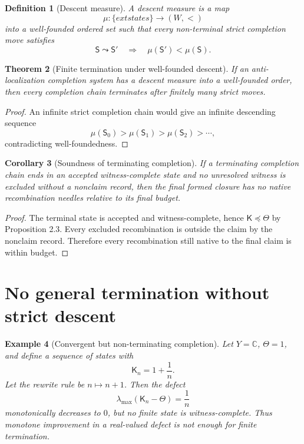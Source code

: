 \documentclass[11pt]{article}
\newtheorem{theorem}{Theorem}[section]
\newtheorem{definition}[theorem]{Definition}
\newtheorem{corollary}[theorem]{Corollary}
\newtheorem{example}[theorem]{Example}
\newcommand{\K}{\mathsf K}
\newcommand{\Sstate}{\mathsf S}
\newcommand{\pre}{\preceq}
\begin{document}
\begin{definition}[Descent measure]
A descent measure is a map
\[
\mu:\{	ext{states}\}\to(W,<)
\]
into a well-founded ordered set such that every non-terminal strict completion move satisfies
\[
\Sstate\leadsto\Sstate'
\quad\Longrightarrow\quad
\mu(\Sstate')<\mu(\Sstate).
\]
\end{definition}

\begin{theorem}[Finite termination under well-founded descent]
If an anti-localization completion system has a descent measure into a well-founded order, then every completion chain terminates after finitely many strict moves.
\end{theorem}

\begin{proof}
An infinite strict completion chain would give an infinite descending sequence
\[
\mu(\Sstate_0)>\mu(\Sstate_1)>\mu(\Sstate_2)>\cdots,
\]
contradicting well-foundedness.
\end{proof}

\begin{corollary}[Soundness of terminating completion]
If a terminating completion chain ends in an accepted witness-complete state and no unresolved witness is excluded without a nonclaim record, then the final formed closure has no native recombination needles relative to its final budget.
\end{corollary}

\begin{proof}
The terminal state is accepted and witness-complete, hence $\K\pre\Theta$ by Proposition 2.3.  Every excluded recombination is outside the claim by the nonclaim record.  Therefore every recombination still native to the final claim is within budget.
\end{proof}

\section{No general termination without strict descent}

\begin{example}[Convergent but non-terminating completion]
Let $Y=\mathbb C$, $\Theta=1$, and define a sequence of states with
\[
\K_n=1+\frac1n.
\]
Let the rewrite rule be $n\mapsto n+1$.  Then the defect
\[
\lambda_{\max}(\K_n-\Theta)=\frac1n
\]
monotonically decreases to $0$, but no finite state is witness-complete.  Thus monotone improvement in a real-valued defect is not enough for finite termination.
\end{example}
\end{document}
